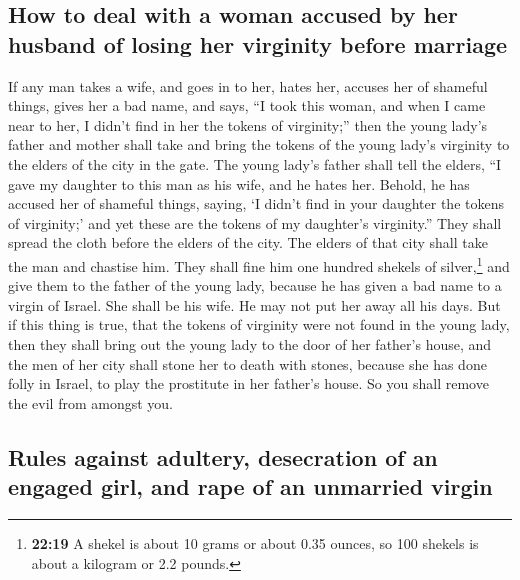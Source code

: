 \hypertarget{how-to-deal-with-a-woman-accused-by-her-husband-of-losing-her-virginity-before-marriage}{%
\subsection{How to deal with a woman accused by her husband of losing
her virginity before
marriage}\label{how-to-deal-with-a-woman-accused-by-her-husband-of-losing-her-virginity-before-marriage}}

 If any man takes a wife, and goes in to her, hates her,
 accuses her of shameful things, gives her a bad name,
and says, ``I took this woman, and when I came near to her, I didn't
find in her the tokens of virginity;''  then the young
lady's father and mother shall take and bring the tokens of the young
lady's virginity to the elders of the city in the gate. 
The young lady's father shall tell the elders, ``I gave my daughter to
this man as his wife, and he hates her.  Behold, he has
accused her of shameful things, saying, `I didn't find in your daughter
the tokens of virginity;' and yet these are the tokens of my daughter's
virginity.'' They shall spread the cloth before the elders of the city.
 The elders of that city shall take the man and chastise
him.  They shall fine him one hundred shekels of
silver,\footnote{\textbf{22:19} A shekel is about 10 grams or about 0.35
  ounces, so 100 shekels is about a kilogram or 2.2 pounds.} and give
them to the father of the young lady, because he has given a bad name to
a virgin of Israel. She shall be his wife. He may not put her away all
his days.  But if this thing is true, that the tokens of
virginity were not found in the young lady,  then they
shall bring out the young lady to the door of her father's house, and
the men of her city shall stone her to death with stones, because she
has done folly in Israel, to play the prostitute in her father's house.
So you shall remove the evil from amongst you.

\hypertarget{rules-against-adultery-desecration-of-an-engaged-girl-and-rape-of-an-unmarried-virgin}{%
\subsection{Rules against adultery, desecration of an engaged girl, and
rape of an unmarried
virgin}\label{rules-against-adultery-desecration-of-an-engaged-girl-and-rape-of-an-unmarried-virgin}}


